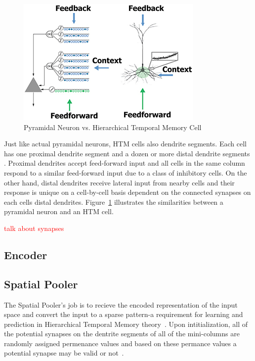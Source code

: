 \documentclass[oneside,12pt,openany]{book}
\begin{document}
	\begin{figure}[!ht]
		\centering
		\includegraphics[width=.7\linewidth]{images/HTMCell.jpg}
		\caption[Pyramidal Neuron vs. Hierarchical Temporal Memory Cell]{Pyramidal Neuron vs. Hierarchical Temporal Memory Cell~\cite{TheHTMSpatialPooler}}
		\label{fig:HTMCell}
	\end{figure}

	Just like actual pyramidal neurons, HTM cells also dendrite segments. Each cell has one proximal dendrite segment and a dozen or more distal dendrite segments \cite {Whitepaper}. Proximal dendrites accept feed-forward input and all cells in the same column respond to a similar feed-forward input due to a class of inhibitory cells. On the other hand, distal dendrites receive lateral input from nearby cells and their response is unique on a cell-by-cell basis dependent on the connected synapses on each cells distal dendrites. Figure~\ref{fig:HTMCell} illustrates the similarities between a pyramidal neuron and an HTM cell.
	
	\textcolor{red}{talk about synapses}
	
	\subsection{Encoder}
	
	\subsection{Spatial Pooler}

	The Spatial Pooler's job is to recieve the encoded representation of the input space and convert the input to a sparse pattern-a requirement for learning and prediction in Hierarchical Temporal Memory theory~\cite{Whitepaper}. Upon intitialization, all of the potential synapses on the dentrite segments of all of the mini-columns are randomly assigned permenance values and based on these permance values a potential synapse may be valid or not~\cite{Whitepaper}. 
\end{document}
